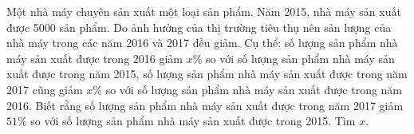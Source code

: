 \begin{ex}%
Một nhà máy chuyên sản xuất một loại sản phẩm. Năm 2015, nhà máy sản xuất được 5000 sản phẩm. Do ảnh hưởng của thị trường tiêu thụ nên sản lượng của nhà máy trong các năm 2016 và 2017 đều giảm. Cụ thể: số lượng sản phẩm nhà máy sản xuất được trong 2016 giảm $x\%$ so với số lượng sản phẩm nhà máy sản xuất được trong năm 2015, số lượng sản phẩm nhà máy sản xuất được trong năm 2017 cũng giảm $x\%$ so với số lượng sản phẩm nhà máy sản xuất được trong năm 2016. Biết rằng số lượng sản phẩm nhà máy sản xuất được trong năm 2017 giảm $51\%$ so với số lượng sản phẩm nhà máy sản xuất được trong 2015. Tìm $x$.
    \end{ex}
    
